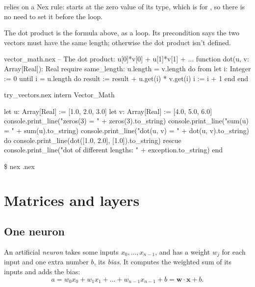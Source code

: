 \documentclass[11pt,a4paper,oneside,openany]{book}
\newcommand{\tryoutput}[1]{%
  \begin{tcolorbox}[outbox]
  {\ttfamily\footnotesize\color{outfg}\$ nex \detokenize{#1}.nex}\par\vspace{2pt}
  
  \end{tcolorbox}}
\newcommand{\code}[1]{\texttt{\detokenize{#1}}}
\newcommand{\vect}[1]{\mathbf{#1}}
\begin{document}
\code{sum} relies on a Nex rule: \code{result} starts at the zero value of
its type, which is \code{0.0} for \code{Real}, so there is no need to set
it before the loop.

The dot product is the formula above, as a loop. Its precondition says
the two vectors must have the same length; otherwise the dot product isn't
defined.

\begin{append}{vector_math.nex}
-- The dot product: u[0]*v[0] + u[1]*v[1] + ...
function dot(u, v: Array[Real]): Real
require
  same_length: u.length = v.length
do
  from
    let i: Integer := 0
  until
    i = u.length
  do
    result := result + u.get(i) * v.get(i)
    i := i + 1
  end
end
\end{append}

\begin{tryit}{try_vectors.nex}
intern Vector_Math

let u: Array[Real] := [1.0, 2.0, 3.0]
let v: Array[Real] := [4.0, 5.0, 6.0]
console.print_line("zeros(3)  = " + zeros(3).to_string)
console.print_line("sum(u)    = " + sum(u).to_string)
console.print_line("dot(u, v) = " + dot(u, v).to_string)
do
  console.print_line(dot([1.0, 2.0], [1.0]).to_string)
rescue
  console.print_line("dot of different lengths: " + exception.to_string)
end
\end{tryit}
\tryoutput{try_vectors}

\chapter{Matrices and layers}

\section{One neuron}

An artificial \emph{neuron} takes some inputs $x_0, \dots, x_{n-1}$, and
has a weight $w_j$ for each input and one extra number $b$, its
\emph{bias}. It computes the weighted sum of its inputs and adds the bias:
\[
  a = w_0 x_0 + w_1 x_1 + \dots + w_{n-1} x_{n-1} + b = \vect{w}\cdot\vect{x} + b.
\]

\begin{center}
\end{center}
\end{document}
